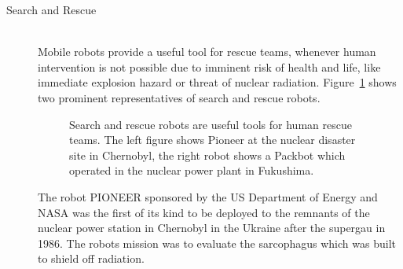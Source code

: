 \begin{description}
\item[Search and Rescue]\hfill \\
Mobile robots provide a useful tool for rescue teams, whenever human intervention is not possible due to imminent risk of health and life, like immediate explosion hazard or threat of nuclear radiation.  
Figure~\ref{fig:fig_rescue} shows two prominent representatives of search and rescue robots.
\begin{figure}[thpb]
	  \myfloatalign
      \footnotesize
      \centering
   \caption[Rescue robots]{Search and rescue robots are useful tools for human rescue teams. The left figure shows Pioneer at the nuclear disaster site in Chernobyl, the right robot shows a Packbot which operated in the nuclear power plant in Fukushima.}
   \label{fig:fig_rescue}
\end{figure}

The robot PIONEER sponsored by the US Department of Energy and NASA was the first of its kind to be deployed to the remnants of the nuclear power station in Chernobyl in the Ukraine after the supergau in 1986. 
The robots mission was to evaluate the sarcophagus which was built to shield off radiation.


\end{description}
